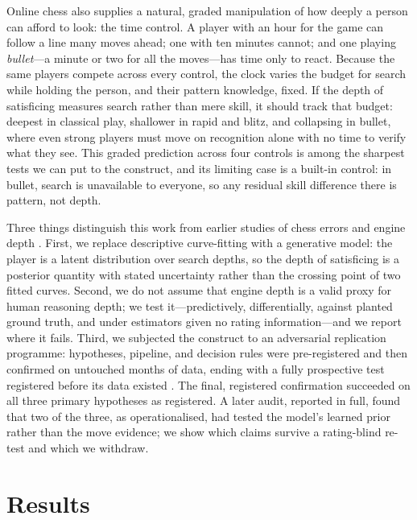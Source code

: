 Online chess also supplies a natural, graded manipulation of how deeply a person can afford to
look: the time control. A player with an hour for the game can follow a line many moves ahead;
one with ten minutes cannot; and one playing \emph{bullet}---a minute or two for all the
moves---has time only to react. Because the same players compete across every control, the
clock varies the budget for search while holding the person, and their pattern knowledge,
fixed. If the depth of satisficing measures search rather than mere skill, it should track
that budget: deepest in classical play, shallower in rapid and blitz, and collapsing in
bullet, where even strong players must move on recognition alone with no time to verify what
they see. This graded prediction across four controls is among the sharpest tests we can put
to the construct, and its limiting case is a built-in control: in bullet, search is
unavailable to everyone, so any residual skill difference there is pattern, not depth.

Three things distinguish this work from earlier studies of chess errors and engine depth
\citep{regan2011,biswas2015,mcilroyyoung2020}. First, we replace descriptive curve-fitting
with a generative model: the player is a latent distribution over search depths, so the depth
of satisficing is a posterior quantity with stated uncertainty rather than the crossing point
of two fitted curves. Second, we do not assume that engine depth is a valid proxy for human
reasoning depth; we test it---predictively, differentially, against planted ground truth, and
under estimators given no rating information---and we report where it fails. Third, we
subjected the construct to an adversarial replication programme: hypotheses, pipeline, and
decision rules were pre-registered and then confirmed on untouched months of data, ending
with a fully prospective test registered before its data existed \citep{nosek2018}. The
final, registered confirmation succeeded on all three primary hypotheses as registered. A
later audit, reported in full, found that two of the three, as operationalised, had tested
the model's learned prior rather than the move evidence; we show which claims survive a
rating-blind re-test and which we withdraw.

\section{Results}

